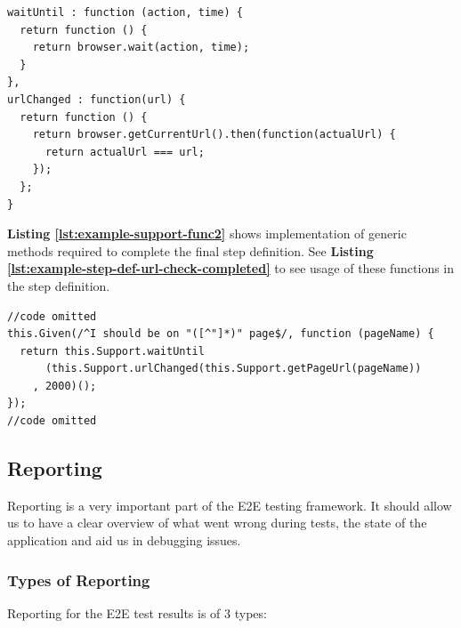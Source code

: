 \begin{listing}[H]
\begin{verbatim}
waitUntil : function (action, time) {
  return function () {
    return browser.wait(action, time);
  }
},
urlChanged : function(url) {
  return function () {
    return browser.getCurrentUrl().then(function(actualUrl) {
      return actualUrl === url;
    });
  };
}
\end{verbatim}
\label{lst:example-support-func2}
\end{listing}

\textbf{Listing \ref{lst:example-support-func2}} shows implementation of generic methods required to complete the final step definition. See \textbf{Listing \ref{lst:example-step-def-url-check-completed}} to see usage of these functions in the step definition.

\begin{listing}[H]
\begin{verbatim}
//code omitted
this.Given(/^I should be on "([^"]*)" page$/, function (pageName) {
  return this.Support.waitUntil
      (this.Support.urlChanged(this.Support.getPageUrl(pageName))
    , 2000)();
});
//code omitted
\end{verbatim}
\label{lst:example-step-def-url-check-completed}
\end{listing}

\subsection{Reporting}
\label{subsec:reporting}

Reporting is a very important part of the E2E testing framework. It should allow us to have a clear overview of what went wrong during tests, the state of the application and aid us in debugging issues.

\subsubsection{Types of Reporting}
\label{subsubsec:types-of-reporting}

Reporting for the E2E test results is of 3 types:

